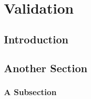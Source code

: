 \chapter{Validation}
\label{validation}

\section{Introduction}
\label{introduction}

\section{Another Section}

\subsection{A Subsection}
